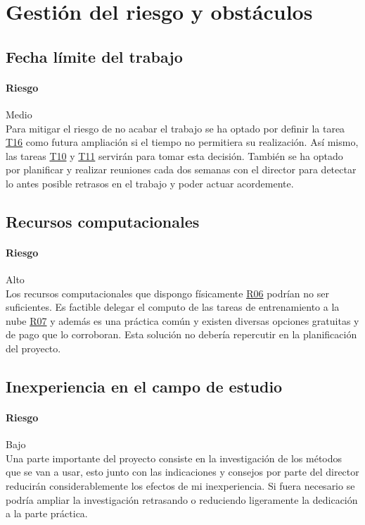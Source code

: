 
\chapter{Gestión del riesgo y obstáculos}\label{riskmanagement}
\section{Fecha límite del trabajo}
\subsubsection{Riesgo} Medio\\
Para mitigar el riesgo de no acabar el trabajo se ha optado por definir la tarea \hyperref[T16]{T16} 
como futura ampliación si el tiempo no permitiera su realización. Así mismo, las tareas \hyperref[T10]{T10} y
\hyperref[T11]{T11} servirán para tomar esta decisión.
También se ha optado por planificar y realizar reuniones cada dos semanas con el director
para detectar lo antes posible retrasos en el trabajo y poder actuar acordemente.

\section{Recursos computacionales}
\subsubsection{Riesgo} Alto\\
Los recursos computacionales que dispongo físicamente \hyperref[R06]{R06} podrían no ser suficientes.
Es factible delegar el computo de las tareas de entrenamiento a la nube \hyperref[R07]{R07} y además es una práctica común y existen diversas opciones gratuitas y de pago que lo corroboran.
Esta solución no debería repercutir en la planificación del proyecto.

\section{Inexperiencia en el campo de estudio}
\subsubsection{Riesgo} Bajo\\
Una parte importante del proyecto consiste en la investigación de los métodos que se van a usar, esto
junto con las indicaciones y consejos por parte del director reducirán considerablemente los efectos
de mi inexperiencia.
Si fuera necesario se podría ampliar la investigación retrasando o reduciendo ligeramente la
dedicación a la parte práctica.

